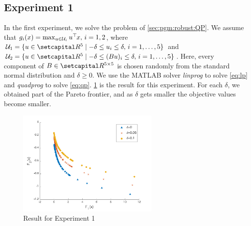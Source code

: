 \documentclass[../main]{subfiles}
\begin{document}
\subsection*{Experiment 1}
In the first experiment, we solve the problem of \cref{sec:pgm:robust:QP}. We assume that $g_i(x) = \max_{u \in \mathcal{U}_i } u^\top\hspace{-1pt} x,\, i = 1,2$, where $\mathcal{U}_1 = \{u \in \setR^5\mid -\delta \leq u_i \leq \delta,\, i = 1,\dots,5 \}$ and $\mathcal{U}_2 = \{u \in \setR^5\mid -\delta \leq (Bu)_i \leq \delta,\, i = 1,\dots,5 \}$. Here, every component of $B \in \setR^{5 \times 5}$ is chosen randomly from the standard normal distribution and $\delta \geq 0$. We use the MATLAB solver \emph{linprog} to solve \cref{eq:lp} and \emph{quadprog} to solve \cref{eq:qp}. \cref{fig:experiment1} is the result for this experiment. For each $\delta$, we obtained part of the Pareto frontier, and as $\delta$ gets smaller the objective values become smaller.
\begin{figure}[htbp]
\centering
\includegraphics[clip, width = 7.0cm]{figs/linear_polyhedron_without_line_search}
\caption{Result for Experiment 1}
\label{fig:experiment1}
\end{figure}
\end{document}

